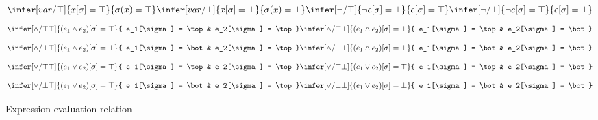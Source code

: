 \begin{figure}
\begin{mdframed}
  {\footnotesize
  \begin{align*}
    \infer[var/\top]
    {
        x[\sigma] = \top
    }
    {
        \sigma(x) = \top
    }
    \infer[var/\bot]
    {
        x[\sigma] = \bot
    }
    {
        \sigma(x) = \bot
    }
    \infer[\neg/\top]
    {
        \neg e[\sigma] = \bot
    }
    {
        e[\sigma] = \top
    }
    \infer[\neg/\bot]
    {
        \neg e[\sigma] = \top
    }
    {
        e[\sigma] = \bot
    }
  \end{align*}
  \begin{align*}
    \infer[\land/\top\top]
    {
        (e_1 \land e_2)[\sigma] = \top
    }
    {
        e_1[\sigma] = \top
        & e_2[\sigma] = \top
    }
    \infer[\land/\top\bot]
    {
        (e_1 \land e_2)[\sigma] = \bot
    }
    {
        e_1[\sigma] = \top
        & e_2[\sigma] = \bot
    }
  \end{align*}
  \begin{align*}
    \infer[\land/\bot\top]
    {
        (e_1 \land e_2)[\sigma] = \bot
    }
    {
        e_1[\sigma] = \bot
        & e_2[\sigma] = \top
    }
    \infer[\land/\bot\bot]
    {
        (e_1 \land e_2)[\sigma] = \bot
    }
    {
        e_1[\sigma] = \bot
        & e_2[\sigma] = \bot
    }
  \end{align*}
  \begin{align*}
    \infer[\lor/\top\top]
    {
        (e_1 \lor e_2)[\sigma] = \top
    }
    {
        e_1[\sigma] = \top
        & e_2[\sigma] = \top
    }
    \infer[\lor/\top\bot]
    {
        (e_1 \lor e_2)[\sigma] = \top
    }
    {
        e_1[\sigma] = \top
        & e_2[\sigma] = \bot
    }
  \end{align*}
  \begin{align*}
    \infer[\lor/\bot\top]
    {
        (e_1 \lor e_2)[\sigma] = \top
    }
    {
        e_1[\sigma] = \bot
        & e_2[\sigma] = \top
    }
    \infer[\lor/\bot\bot]
    {
        (e_1 \lor e_2)[\sigma] = \bot
    }
    {
        e_1[\sigma] = \bot
        & e_2[\sigma] = \bot
    }
  \end{align*}
  }
\end{mdframed}
\caption{Expression evaluation relation}
\label{fig:pineappl-expr-eval}
\end{figure}
